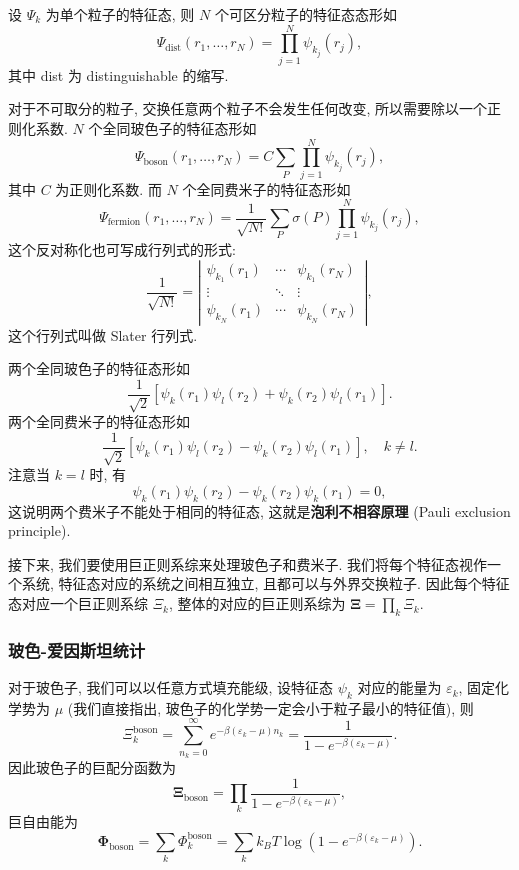 设 $ \Psi_k $ 为单个粒子的特征态, 则 $ N $ 个可区分粒子的特征态态形如
\[ \Psi_{\mathrm{dist}}(r_1,\dots,r_N)=\prod_{j=1}^N\psi_{k_j}(r_j), \]
其中 dist 为 distinguishable 的缩写.

对于不可取分的粒子, 交换任意两个粒子不会发生任何改变, 所以需要除以一个正则化系数. $ N $ 个全同玻色子的特征态形如
\[ \Psi_{\mathrm{boson}}(r_1,\dots,r_N)=C\sum_P\prod_{j=1}^N\psi_{k_j}(r_j), \]
其中 $ C $ 为正则化系数. 而 $ N $ 个全同费米子的特征态形如
\[ \Psi_{\mathrm{fermion}}(r_1,\dots,r_N)=\frac{1}{\sqrt{N!}}\sum_P\sigma(P)\prod_{j=1}^N\psi_{k_j}(r_j), \]
这个反对称化也可写成行列式的形式:
\[ \frac{1}{\sqrt{N!}}=\left| \begin{matrix}
    \psi_{k_1}(r_1) & \cdots & \psi_{k_1}(r_N)\\
    \vdots & \ddots & \vdots\\ 
    \psi_{k_N}(r_1) & \cdots & \psi_{k_N}(r_N)
\end{matrix} \right|, \]
这个行列式叫做 Slater 行列式.

\begin{example}[泡利不相容原理]
    两个全同玻色子的特征态形如
    \[ \frac{1}{\sqrt{2}}\left[ \psi_k(r_1)\psi_l(r_2)+\psi_k(r_2)\psi_l(r_1) \right]. \]
    两个全同费米子的特征态形如
    \[ \frac{1}{\sqrt{2}}\left[ \psi_k(r_1)\psi_l(r_2)-\psi_k(r_2)\psi_l(r_1) \right],\quad k\neq l. \]
    注意当 $ k=l $ 时, 有
    \[  \psi_k(r_1)\psi_k(r_2)-\psi_k(r_2)\psi_k(r_1)=0,  \]
    这说明两个费米子不能处于相同的特征态, 这就是{\bf 泡利不相容原理} (Pauli exclusion principle).
\end{example}

接下来, 我们要使用巨正则系综来处理玻色子和费米子. 我们将每个特征态视作一个系统, 特征态对应的系统之间相互独立, 且都可以与外界交换粒子. 因此每个特征态对应一个巨正则系综 $ \Xi_k $, 整体的对应的巨正则系综为 $ \bm\Xi=\prod_k\Xi_k $.

\subsubsection*{玻色-爱因斯坦统计}
对于玻色子, 我们可以以任意方式填充能级, 设特征态 $ \psi_k $ 对应的能量为 $ \varepsilon_k $, 固定化学势为 $ \mu $ (我们直接指出, 玻色子的化学势一定会小于粒子最小的特征值), 则
\[ \Xi^{\mathrm{boson}}_k=\sum_{n_k=0}^{\infty}e^{-\beta(\varepsilon_k-\mu)n_k}=\frac{1}{1-e^{-\beta(\varepsilon_k-\mu)}}. \]
因此玻色子的巨配分函数为
\[ \bm\Xi_{\mathrm{boson}}=\prod_k\frac{1}{1-e^{-\beta(\varepsilon_k-\mu)}}, \]
巨自由能为
\[ \bm\Phi_{\mathrm{boson}}=\sum_k\Phi_k^{\mathrm{boson}}=\sum_k k_BT\log\left( 1-e^{-\beta(\varepsilon_k-\mu)} \right). \]

